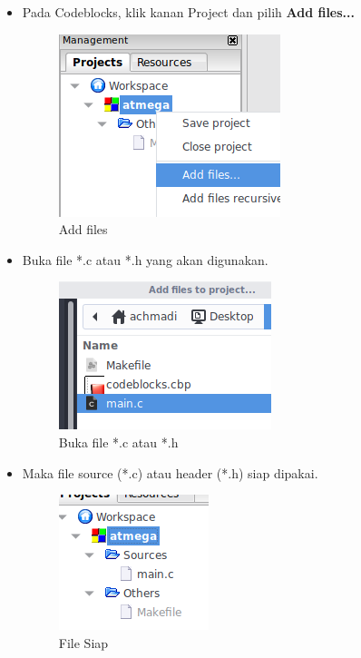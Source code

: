 \documentclass[12pt,]{article}
\begin{document}
	\begin{itemize}
	
		\item Pada Codeblocks, klik kanan Project dan pilih \textbf{Add files...}
		
		\begin{figure}[H]
			\centering
			\includegraphics[width=0.5\linewidth]{images/cbp_3}
			\caption{Add files}
		\end{figure}
		
		\item Buka file *.c atau *.h yang akan digunakan.
		
		\begin{figure}[H]
			\centering
			\includegraphics[width=0.5\linewidth]{images/cbp_4}
			\caption{Buka file *.c atau *.h}
		\end{figure}
		
		\newpage
		\item Maka file source (*.c) atau header (*.h) siap dipakai.
		
		\begin{figure}[H]
			\centering
			\includegraphics[width=0.5\linewidth]{images/cbp_5}
			\caption{File Siap}
		\end{figure}
		
	\end{itemize}
\end{document}
